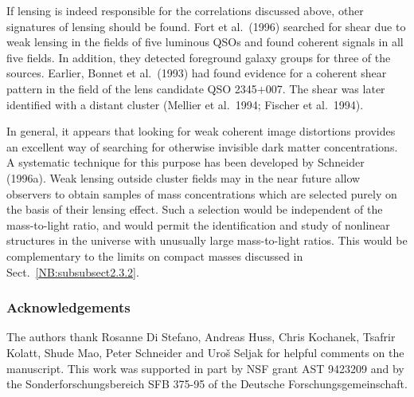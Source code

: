 \documentclass[a4paper,10pt]{article} %
\begin{document}
If lensing is indeed responsible for the correlations discussed above,
other signatures of lensing should be found. Fort et al.\ (1996)
searched for shear due to weak lensing in the fields of five luminous
QSOs and found coherent signals in all five fields. In addition, they
detected foreground galaxy groups for three of the sources. Earlier,
Bonnet et al.\ (1993) had found evidence for a coherent shear pattern
in the field of the lens candidate QSO 2345$+$007. The shear was later
identified with a distant cluster (Mellier et al.\ 1994; Fischer et
al.\ 1994).

In general, it appears that looking for weak coherent image
distortions provides an excellent way of searching for otherwise
invisible dark matter concentrations. A systematic technique for this
purpose has been developed by Schneider (1996a). Weak lensing outside
cluster fields may in the near future allow observers to obtain
samples of mass concentrations which are selected purely on the basis
of their lensing effect. Such a selection would be independent of the
mass-to-light ratio, and would permit the identification and study of
nonlinear structures in the universe with unusually large
mass-to-light ratios. This would be complementary to the limits on
compact masses discussed in Sect.\ \ref{NB:subsubsect2.3.2}.

\subsubsection*{Acknowledgements}

The authors thank Rosanne Di Stefano, Andreas Huss, Chris Kochanek,
Tsafrir Kolatt, Shude Mao, Peter Schneider and Uro\v{s} Seljak for
helpful comments on the manuscript. This work was supported in part by
NSF grant AST 9423209 and by the Sonderforschungsbereich SFB 375-95 of
the Deutsche Forschungsgemeinschaft.
\end{document}
